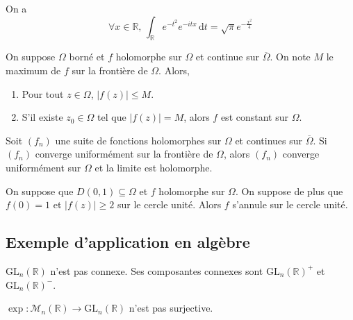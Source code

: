 
	\begin{application}
		On a
		\[ \forall x \in \mathbb{R}, \, \int_{\mathbb{R}} e^{-t^2} e^{-itx} \, \mathrm{d}t = \sqrt{\pi} e^{-\frac{x^2}{4}} \]
	\end{application}


	\begin{theorem}
		On suppose $\Omega$ borné et $f$ holomorphe sur $\Omega$ et continue sur $\overline{\Omega}$. On note $M$ le maximum de $f$ sur la frontière de $\Omega$. Alors,
		\begin{enumerate}[label=(\roman*)]
			\item Pour tout $z \in \Omega$, $\vert f(z) \vert \leq M$.
			\item S'il existe $z_0 \in \Omega$ tel que $\vert f(z) \vert = M$, alors $f$ est constant sur $\Omega$.
		\end{enumerate}
	\end{theorem}


	\begin{application}
		Soit $(f_n)$ une suite de fonctions holomorphes sur $\Omega$ et continues sur $\overline{\Omega}$. Si $(f_n)$ converge uniformément sur la frontière de $\Omega$, alors $(f_n)$ converge uniformément sur $\Omega$ et la limite est holomorphe.
	\end{application}

	\begin{application}
		On suppose que $D(0,1) \subseteq \Omega$ et $f$ holomorphe sur $\Omega$. On suppose de plus que $f(0) = 1$ et $\vert f(z) \vert \geq 2$ sur le cercle unité. Alors $f$ s'annule sur le cercle unité.
	\end{application}

	\subsection{Exemple d'application en algèbre}


	\begin{proposition}
		$\mathrm{GL}_n(\mathbb{R})$ n'est pas connexe. Ses composantes connexes sont $\mathrm{GL}_n(\mathbb{R})^+$ et $\mathrm{GL}_n(\mathbb{R})^-$.
	\end{proposition}

	\begin{application}
		$\exp : \mathcal{M}_n(\mathbb{R}) \rightarrow \mathrm{GL}_n(\mathbb{R})$ n'est pas surjective.
	\end{application}

